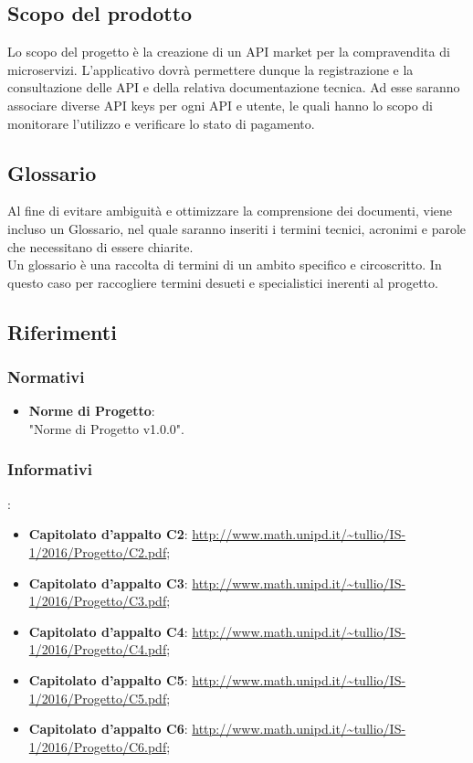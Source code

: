 \documentclass[12pt,a4paper,titlepage]{article}
\begin{document}
	\subsection{Scopo del prodotto}
	Lo scopo del progetto è la creazione di un API market per la compravendita di microservizi. L'applicativo dovrà permettere dunque la registrazione e la consultazione delle API e della relativa documentazione tecnica. Ad esse saranno associare diverse API keys per ogni API e utente, le quali hanno lo scopo di monitorare l'utilizzo e verificare lo stato di pagamento.
	
	\subsection{Glossario}
	Al fine di evitare ambiguità e ottimizzare la comprensione dei documenti, viene incluso un Glossario, nel quale saranno inseriti i termini tecnici, acronimi e parole che necessitano di essere chiarite.\\
	Un glossario è una raccolta di termini di un ambito specifico e circoscritto. In questo caso per raccogliere termini desueti e specialistici inerenti al progetto. 
	
	\subsection{Riferimenti}
	\subsubsection{Normativi}
	\begin{itemize}
		\item \textbf{Norme di Progetto}: \\
		"Norme di Progetto v1.0.0".
	\end{itemize}
	\subsubsection{Informativi}:	
	\begin{itemize}
		\item \textbf{Capitolato d'appalto C2}: \textcolor{blue}{\url{http://www.math.unipd.it/~tullio/IS-1/2016/Progetto/C2.pdf}};
		\item \textbf{Capitolato d'appalto C3}: \textcolor{blue}{\url{http://www.math.unipd.it/~tullio/IS-1/2016/Progetto/C3.pdf}}; 
		\item \textbf{Capitolato d'appalto C4}: \textcolor{blue}{\url{http://www.math.unipd.it/~tullio/IS-1/2016/Progetto/C4.pdf}}; 
		\item \textbf{Capitolato d'appalto C5}: \textcolor{blue}{\url{http://www.math.unipd.it/~tullio/IS-1/2016/Progetto/C5.pdf}}; 
		\item \textbf{Capitolato d'appalto C6}: \textcolor{blue}{\url{http://www.math.unipd.it/~tullio/IS-1/2016/Progetto/C6.pdf}}; 
	\end{itemize} 
	
\end{document}
